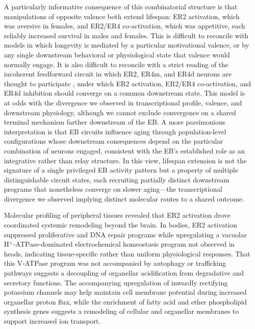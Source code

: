 A particularly informative consequence of this combinatorial structure is that manipulations of opposite valence both extend lifespan: ER2 activation, which was aversive in females, and ER2/ER4 co-activation, which was appetitive, each reliably increased survival in males and females.
This is difficult to reconcile with models in which longevity is mediated by a particular motivational valence, or by any single downstream behavioral or physiological state that valence would normally engage.
It is also difficult to reconcile with a strict reading of the incoherent feedforward circuit in which ER2, ER4m, and ER4d neurons are thought to participate \citep{ishimoto2020}, under which ER2 activation, ER2/ER4 co-activation, and ER4d inhibition should converge on a common downstream state. This model is at odds with the divergence we observed in transcriptional profile, valence, and downstream physiology, although we cannot exclude convergence on a shared terminal mechanism farther downstream of the EB.
A more parsimonious interpretation is that EB circuits influence aging through population-level configurations whose downstream consequences depend on the particular combination of neurons engaged, consistent with the EB's established role as an integrative rather than relay structure.
In this view, lifespan extension is not the signature of a single privileged EB activity pattern but a property of multiple distinguishable circuit states, each recruiting partially distinct downstream programs that nonetheless converge on slower aging---the
transcriptional divergence we observed implying distinct molecular routes to a shared outcome.

Molecular profiling of peripheral tissues revealed that ER2 activation drove coordinated systemic remodeling beyond the brain.
In bodies, ER2 activation suppressed proliferative and DNA repair programs while upregulating a vacuolar H$^{+}$-ATPase-dominated electrochemical homeostasis program not observed in heads, indicating tissue-specific rather than uniform physiological responses.
That this V-ATPase program was not accompanied by autophagy or trafficking pathways suggests a decoupling of organellar acidification from degradative and secretory functions.
The accompanying upregulation of inwardly rectifying potassium channels may help maintain cell membrane potential during increased organellar proton flux, while the enrichment of fatty acid and ether phospholipid synthesis genes suggests a remodeling of cellular and organellar membranes to support increased ion transport.

